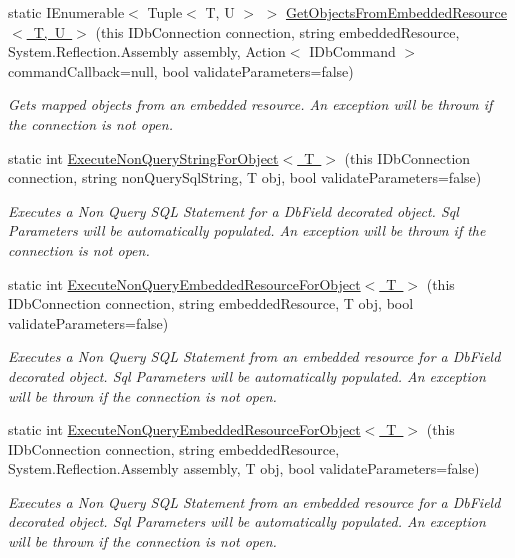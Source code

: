\begin{DoxyCompactItemize}
static I\+Enumerable$<$ Tuple$<$ T, U $>$ $>$ \mbox{\hyperlink{class_blue_cloud_1_1_extensions_1_1_data_1_1_i_db_connection_extensions_a153750e71b28ba5bd687c95e83485914}{Get\+Objects\+From\+Embedded\+Resource$<$ T, U $>$}} (this I\+Db\+Connection connection, string embedded\+Resource, System.\+Reflection.\+Assembly assembly, Action$<$ I\+Db\+Command $>$ command\+Callback=null, bool validate\+Parameters=false)
\begin{DoxyCompactList}\small\item\em Gets mapped objects from an embedded resource. An exception will be thrown if the connection is not open. \end{DoxyCompactList}\item 
static int \mbox{\hyperlink{class_blue_cloud_1_1_extensions_1_1_data_1_1_i_db_connection_extensions_ab62a6fdee017e2623bed5e2f1e8ebc1f}{Execute\+Non\+Query\+String\+For\+Object$<$ T $>$}} (this I\+Db\+Connection connection, string non\+Query\+Sql\+String, T obj, bool validate\+Parameters=false)
\begin{DoxyCompactList}\small\item\em Executes a Non Query S\+QL Statement for a Db\+Field decorated object. Sql Parameters will be automatically populated. An exception will be thrown if the connection is not open. \end{DoxyCompactList}\item 
static int \mbox{\hyperlink{class_blue_cloud_1_1_extensions_1_1_data_1_1_i_db_connection_extensions_af558e620660d15904b4eec510bd47af5}{Execute\+Non\+Query\+Embedded\+Resource\+For\+Object$<$ T $>$}} (this I\+Db\+Connection connection, string embedded\+Resource, T obj, bool validate\+Parameters=false)
\begin{DoxyCompactList}\small\item\em Executes a Non Query S\+QL Statement from an embedded resource for a Db\+Field decorated object. Sql Parameters will be automatically populated. An exception will be thrown if the connection is not open. \end{DoxyCompactList}\item 
static int \mbox{\hyperlink{class_blue_cloud_1_1_extensions_1_1_data_1_1_i_db_connection_extensions_abc6cbdf1b238168f13a6b2a88e309743}{Execute\+Non\+Query\+Embedded\+Resource\+For\+Object$<$ T $>$}} (this I\+Db\+Connection connection, string embedded\+Resource, System.\+Reflection.\+Assembly assembly, T obj, bool validate\+Parameters=false)
\begin{DoxyCompactList}\small\item\em Executes a Non Query S\+QL Statement from an embedded resource for a Db\+Field decorated object. Sql Parameters will be automatically populated. An exception will be thrown if the connection is not open. \end{DoxyCompactList}\item 

\end{DoxyCompactItemize}
